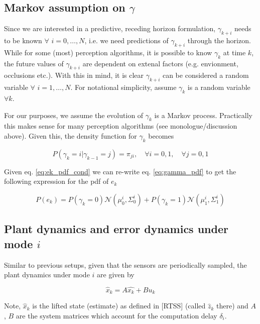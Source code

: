 \documentclass{article}[14pt]
\begin{document}
\subsection{Markov assumption on $\gamma$}

Since we are interested in a predictive, receding horizon formulation, $\gamma_{k+i}$ needs to be known $\forall$ $i=0,\dotsc,N$, i.e. we need predictions of $\gamma_{k+i}$ through the horizon. While for some (most) perception algorithms, it is possible to know $\gamma_k$ at time $k$, the future values of $\gamma_{k+i}$ are dependent on extenal factors (e.g. envionment, occlusions etc.). With this in mind, it is clear $\gamma_{k+i}$ can be considered a random variable $\forall$ $i=1,\dotsc,N$. For notational simplicity, assume $\gamma_k$ is a random variable $\forall k$. 

For our purposes, we assume the evolution of $\gamma_k$ is a Markov process. Practically this makes sense for many perception algorithms (see monologue/discussion above). Given this, the density function for $\gamma_k$ becomes

\begin{equation}
P(\gamma_k=i|\gamma_{k-1}=j) = \pi_{ji}, \quad \forall i=0,1,\quad \forall j=0,1
\label{eq:gamma_pdf}
\end{equation}

Given eq. \ref{eq:ek_pdf_cond} we can re-write eq. \ref{eq:gamma_pdf} to get the following expression for the pdf of $e_k$

\begin{equation}
P(e_k) = P(\gamma_k=0)\mathcal{N}(\mu^i_0,\Sigma^i_0) + P(\gamma_k=1)\mathcal{N}(\mu^i_1,\Sigma^i_1)
\label{eq:ek_pdf_exp}
\end{equation}

\subsection{Plant dynamics and error dynamics under mode $i$}
Similar to previous setups, given that the sensors are periodically sampled, the plant dynamics under mode $i$ are given by

\begin{equation}
\hat{x}_k = A\hat{x_k} + Bu_k
\label{eq:est_dynamics_simple}
\end{equation}

Note, $\hat{x}_k$ is the lifted state (estimate) as defined in [RTSS] (called $\hat{z}_k$ there) and $A$, $B$ are the system matrices which account for the computation delay $\delta_i$. 
\end{document}
